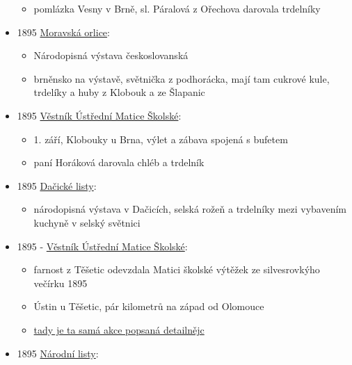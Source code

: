 \begin{itemize}
  \begin{itemize}
  \tightlist
  \item
    pomlázka Vesny v Brně, sl. Páralová z Ořechova darovala trdelníky
  \end{itemize}
\item
  1895
  \href{https://ceskadigitalniknihovna.cz/view/uuid:051a1a8d-32f0-11de-992b-00145e5790ea?page=uuid:2a7c1c1f-32f0-11de-992b-00145e5790ea&fulltext=trdeln\%C3\%AD*&source=mzk}{Moravská
  orlice}:

  \begin{itemize}
  \tightlist
  \item
    Národopisná výstava českoslovanská
  \item
    brněnsko na výstavě, světnička z podhorácka, mají tam cukrové kule,
    trdelíky a huby z Klobouk a ze Šlapanic
  \end{itemize}
\item
  1895
  \href{https://ceskadigitalniknihovna.cz/uuid/uuid:f6731d10-a2e1-11e7-a093-005056825209}{Věstník
  Ústřední Matice Školské}:

  \begin{itemize}
  \tightlist
  \item
    1. září, Klobouky u Brna, výlet a zábava spojená s bufetem
  \item
    paní Horáková darovala chléb a trdelník
  \end{itemize}
\item
  1895
  \href{https://www.digitalniknihovna.cz/vkol/uuid/uuid:a7f4aea1-a2cd-4d9f-a1fa-b43aa3c25dff}{Dačické
  listy}:

  \begin{itemize}
  \tightlist
  \item
    národopisná výstava v Dačicích, selská rožeň a trdelníky mezi
    vybavením kuchyně v selský světnici
  \end{itemize}
\item
  1895 -
  \href{https://ndk.cz/view/uuid:77d41380-a2e4-11e7-a093-005056825209?page=uuid\%3A9cb54070-a343-11e7-a093-005056825209&fulltext=trdeln\%C3\%ADk}{Věstník
  Ústřední Matice Školské}:

  \begin{itemize}
  \tightlist
  \item
    farnost z Těšetic odevzdala Matici školské výtěžek ze silvesrovkýho
    večírku 1895
  \item
    Ústin u Těšetic, pár kilometrů na západ od Olomouce
  \item
    \href{https://ndk.cz/view/uuid:eb8e3d99-435d-11dd-b505-00145e5790ea?page=uuid\%3A04295899-610e-49f5-b5b3-35f73d41b05d&fulltext=trdeln\%C3\%ADk}{tady
    je ta samá akce popsaná detailnějc}
  \end{itemize}
\item
  1895
  \href{https://ceskadigitalniknihovna.cz/uuid/uuid:6ef09ed4-435f-11dd-b505-00145e5790ea}{Národní
  listy}:


\end{itemize}
